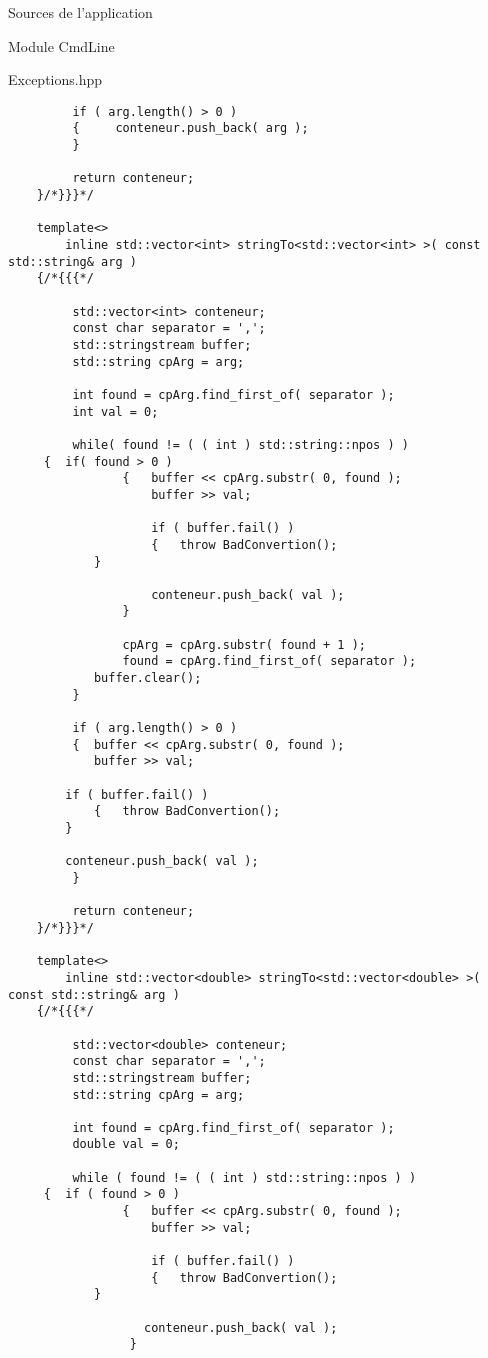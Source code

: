 \documentclass{article}
\begin{document}
\begin{section}{Sources de l'application}
\begin{subsection}{Module CmdLine}
\begin{paragraph}{Exceptions.hpp}
\begin{verbatim}
         if ( arg.length() > 0 ) 
         {     conteneur.push_back( arg );
         }

         return conteneur;
    }/*}}}*/
    
    template<>
        inline std::vector<int> stringTo<std::vector<int> >( const std::string& arg )
    {/*{{{*/

         std::vector<int> conteneur;
         const char separator = ',';
         std::stringstream buffer;
         std::string cpArg = arg;

         int found = cpArg.find_first_of( separator );
         int val = 0;

         while( found != ( ( int ) std::string::npos ) ) 
	 {	if( found > 0 ) 
                {	buffer << cpArg.substr( 0, found );
                   	buffer >> val;
                   
                   	if ( buffer.fail() )
                   	{	throw BadConvertion();
			}

                   	conteneur.push_back( val );
              	}

              	cpArg = cpArg.substr( found + 1 );
              	found = cpArg.find_first_of( separator );
           	buffer.clear();
         }

         if ( arg.length() > 0 ) 
         {	buffer << cpArg.substr( 0, found );
           	buffer >> val;
           	
		if ( buffer.fail() )
           	{	throw BadConvertion();
		}
           	
		conteneur.push_back( val );
         }

         return conteneur;
    }/*}}}*/

    template<>
        inline std::vector<double> stringTo<std::vector<double> >( const std::string& arg )
    {/*{{{*/

         std::vector<double> conteneur;
         const char separator = ',';
         std::stringstream buffer;
         std::string cpArg = arg;

         int found = cpArg.find_first_of( separator );
         double val = 0;

         while ( found != ( ( int ) std::string::npos ) )
	 {	if ( found > 0 )
                {	buffer << cpArg.substr( 0, found );
                 	buffer >> val;
                   
                   	if ( buffer.fail() )
                   	{	throw BadConvertion(); 
			}

                   conteneur.push_back( val );
    	         }


\end{verbatim}
\end{paragraph}
\end{subsection}
\end{section}
\end{document}
